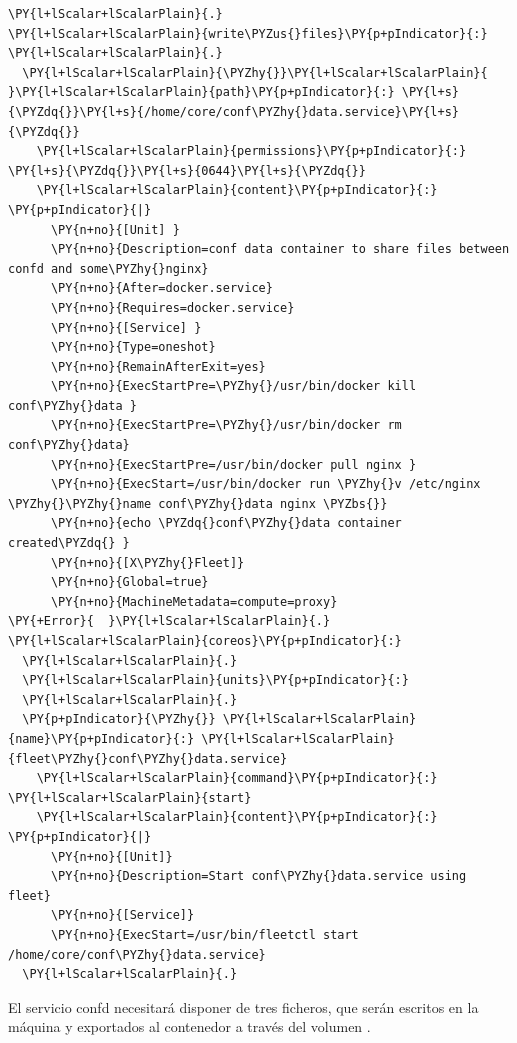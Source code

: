 \begin{codelisting}
\label{code:conf-data}
\begin{Verbatim}[fontsize=\relsize{-2.5},fontseries=b,commandchars=\\\{\}]
\PY{l+lScalar+lScalarPlain}{.}
\PY{l+lScalar+lScalarPlain}{write\PYZus{}files}\PY{p+pIndicator}{:}
\PY{l+lScalar+lScalarPlain}{.}
  \PY{l+lScalar+lScalarPlain}{\PYZhy{}}\PY{l+lScalar+lScalarPlain}{ }\PY{l+lScalar+lScalarPlain}{path}\PY{p+pIndicator}{:} \PY{l+s}{\PYZdq{}}\PY{l+s}{/home/core/conf\PYZhy{}data.service}\PY{l+s}{\PYZdq{}}
    \PY{l+lScalar+lScalarPlain}{permissions}\PY{p+pIndicator}{:} \PY{l+s}{\PYZdq{}}\PY{l+s}{0644}\PY{l+s}{\PYZdq{}}
    \PY{l+lScalar+lScalarPlain}{content}\PY{p+pIndicator}{:} \PY{p+pIndicator}{|}
      \PY{n+no}{[Unit] }
      \PY{n+no}{Description=conf data container to share files between confd and some\PYZhy{}nginx}
      \PY{n+no}{After=docker.service}
      \PY{n+no}{Requires=docker.service}
      \PY{n+no}{[Service] }
      \PY{n+no}{Type=oneshot}
      \PY{n+no}{RemainAfterExit=yes}
      \PY{n+no}{ExecStartPre=\PYZhy{}/usr/bin/docker kill conf\PYZhy{}data }
      \PY{n+no}{ExecStartPre=\PYZhy{}/usr/bin/docker rm conf\PYZhy{}data}
      \PY{n+no}{ExecStartPre=/usr/bin/docker pull nginx }
      \PY{n+no}{ExecStart=/usr/bin/docker run \PYZhy{}v /etc/nginx \PYZhy{}\PYZhy{}name conf\PYZhy{}data nginx \PYZbs{}}
      \PY{n+no}{echo \PYZdq{}conf\PYZhy{}data container created\PYZdq{} }
      \PY{n+no}{[X\PYZhy{}Fleet]}
      \PY{n+no}{Global=true}
      \PY{n+no}{MachineMetadata=compute=proxy}
\PY{+Error}{  }\PY{l+lScalar+lScalarPlain}{.}
\PY{l+lScalar+lScalarPlain}{coreos}\PY{p+pIndicator}{:}
  \PY{l+lScalar+lScalarPlain}{.}
  \PY{l+lScalar+lScalarPlain}{units}\PY{p+pIndicator}{:}
  \PY{l+lScalar+lScalarPlain}{.}
  \PY{p+pIndicator}{\PYZhy{}} \PY{l+lScalar+lScalarPlain}{name}\PY{p+pIndicator}{:} \PY{l+lScalar+lScalarPlain}{fleet\PYZhy{}conf\PYZhy{}data.service}
    \PY{l+lScalar+lScalarPlain}{command}\PY{p+pIndicator}{:} \PY{l+lScalar+lScalarPlain}{start}
    \PY{l+lScalar+lScalarPlain}{content}\PY{p+pIndicator}{:} \PY{p+pIndicator}{|}
      \PY{n+no}{[Unit]}
      \PY{n+no}{Description=Start conf\PYZhy{}data.service using fleet}
      \PY{n+no}{[Service]}
      \PY{n+no}{ExecStart=/usr/bin/fleetctl start /home/core/conf\PYZhy{}data.service}
  \PY{l+lScalar+lScalarPlain}{.}
\end{Verbatim}
\end{codelisting}

El servicio confd necesitará disponer de tres ficheros, que serán escritos en la máquina y exportados al contenedor a través del volumen .

